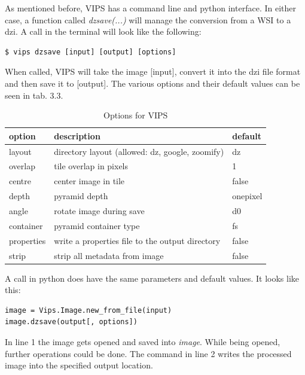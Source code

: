 As mentioned before, VIPS has a command line and python interface. In either case, a function called \emph{dzsave(...)} will manage the conversion from a WSI to a dzi. A call in the terminal will look like the following:

\begin{lstlisting}
$ vips dzsave [input] [output] [options]
\end{lstlisting}

When called, VIPS will take the image [input], convert it into the dzi file format and then save it to [output]. The various options and their default values can be seen in tab. 3.3. 

\begin{table}[H]
	\begin{center}
		\begin{tabular}{| l | l | l |}
			\hline
			\textbf{option} & \textbf{description} & \textbf{default} \\ \hline
			layout & directory layout (allowed: dz, google, zoomify) & dz \\ \hline
			overlap & tile overlap in pixels & 1 \\ \hline
			centre & center image in tile & false \\ \hline
			depth & pyramid depth & onepixel \\ \hline
			angle & rotate image during save & d0 \\ \hline
			container & pyramid container type & fs \\ \hline
			properties & write a properties file to the output directory & false \\ \hline
			strip & strip all metadata from image & false \\ \hline
		\end{tabular}
		\caption{Options for VIPS}
	\end{center}
\end{table}

A call in python does have the same parameters and default values. It looks like this:

\begin{lstlisting}[frame=single]
image = Vips.Image.new_from_file(input)
image.dzsave(output[, options])
\end{lstlisting}

In line 1 the image gets opened and saved into \emph{image}. While being opened, further operations could be done. The command in line 2 writes the processed image into the specified output location.


